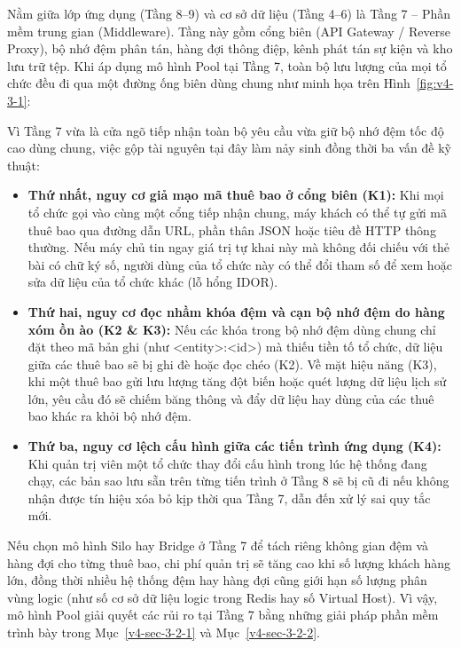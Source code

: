 Nằm giữa lớp ứng dụng (Tầng 8--9) và cơ sở dữ liệu (Tầng 4--6) là Tầng 7 -- Phần mềm trung gian (Middleware). Tầng này gồm cổng biên (API Gateway / Reverse Proxy), bộ nhớ đệm phân tán, hàng đợi thông điệp, kênh phát tán sự kiện và kho lưu trữ tệp. Khi áp dụng mô hình Pool tại Tầng 7, toàn bộ lưu lượng của mọi tổ chức đều đi qua một đường ống biên dùng chung như minh họa trên Hình~\ref{fig:v4-3-1}:


Vì Tầng 7 vừa là cửa ngõ tiếp nhận toàn bộ yêu cầu vừa giữ bộ nhớ đệm tốc độ cao dùng chung, việc gộp tài nguyên tại đây làm nảy sinh đồng thời ba vấn đề kỹ thuật:

\begin{itemize}
\item
  \textbf{Thứ nhất, nguy cơ giả mạo mã thuê bao ở cổng biên (K1):} Khi mọi tổ chức gọi vào cùng một cổng tiếp nhận chung, máy khách có thể tự gửi mã thuê bao qua đường dẫn URL, phần thân JSON hoặc tiêu đề HTTP thông thường. Nếu máy chủ tin ngay giá trị tự khai này mà không đối chiếu với thẻ bài có chữ ký số, người dùng của tổ chức này có thể đổi tham số để xem hoặc sửa dữ liệu của tổ chức khác (lỗ hổng IDOR).
\item
  \textbf{Thứ hai, nguy cơ đọc nhầm khóa đệm và cạn bộ nhớ đệm do hàng xóm ồn ào (K2 \& K3):} Nếu các khóa trong bộ nhớ đệm dùng chung chỉ đặt theo mã bản ghi (như \textless entity\textgreater:\textless id\textgreater) mà thiếu tiền tố tổ chức, dữ liệu giữa các thuê bao sẽ bị ghi đè hoặc đọc chéo (K2). Về mặt hiệu năng (K3), khi một thuê bao gửi lưu lượng tăng đột biến hoặc quét lượng dữ liệu lịch sử lớn, yêu cầu đó sẽ chiếm băng thông và đẩy dữ liệu hay dùng của các thuê bao khác ra khỏi bộ nhớ đệm.
\item
  \textbf{Thứ ba, nguy cơ lệch cấu hình giữa các tiến trình ứng dụng (K4):} Khi quản trị viên một tổ chức thay đổi cấu hình trong lúc hệ thống đang chạy, các bản sao lưu sẵn trên từng tiến trình ở Tầng 8 sẽ bị cũ đi nếu không nhận được tín hiệu xóa bỏ kịp thời qua Tầng 7, dẫn đến xử lý sai quy tắc mới.
\end{itemize}

Nếu chọn mô hình Silo hay Bridge ở Tầng 7 để tách riêng không gian đệm và hàng đợi cho từng thuê bao, chi phí quản trị sẽ tăng cao khi số lượng khách hàng lớn, đồng thời nhiều hệ thống đệm hay hàng đợi cũng giới hạn số lượng phân vùng logic (như số cơ sở dữ liệu logic trong Redis hay số Virtual Host). Vì vậy, mô hình Pool giải quyết các rủi ro tại Tầng 7 bằng những giải pháp phần mềm trình bày trong Mục~\ref{v4-sec-3-2-1} và Mục~\ref{v4-sec-3-2-2}.


